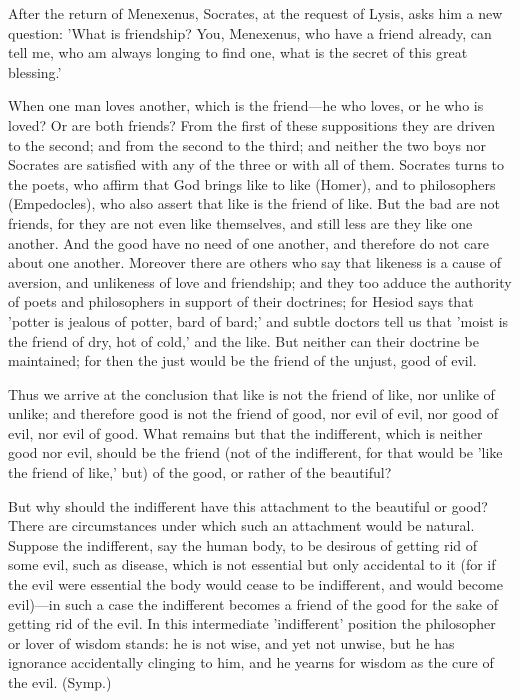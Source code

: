 \documentclass[11pt,letter]{article}
\begin{document}
\par  After the return of Menexenus, Socrates, at the request of Lysis, asks him a new question: 'What is friendship? You, Menexenus, who have a friend already, can tell me, who am always longing to find one, what is the secret of this great blessing.'

\par  When one man loves another, which is the friend—he who loves, or he who is loved? Or are both friends? From the first of these suppositions they are driven to the second; and from the second to the third; and neither the two boys nor Socrates are satisfied with any of the three or with all of them. Socrates turns to the poets, who affirm that God brings like to like (Homer), and to philosophers (Empedocles), who also assert that like is the friend of like. But the bad are not friends, for they are not even like themselves, and still less are they like one another. And the good have no need of one another, and therefore do not care about one another. Moreover there are others who say that likeness is a cause of aversion, and unlikeness of love and friendship; and they too adduce the authority of poets and philosophers in support of their doctrines; for Hesiod says that 'potter is jealous of potter, bard of bard;' and subtle doctors tell us that 'moist is the friend of dry, hot of cold,' and the like. But neither can their doctrine be maintained; for then the just would be the friend of the unjust, good of evil.

\par  Thus we arrive at the conclusion that like is not the friend of like, nor unlike of unlike; and therefore good is not the friend of good, nor evil of evil, nor good of evil, nor evil of good. What remains but that the indifferent, which is neither good nor evil, should be the friend (not of the indifferent, for that would be 'like the friend of like,' but) of the good, or rather of the beautiful?

\par  But why should the indifferent have this attachment to the beautiful or good? There are circumstances under which such an attachment would be natural. Suppose the indifferent, say the human body, to be desirous of getting rid of some evil, such as disease, which is not essential but only accidental to it (for if the evil were essential the body would cease to be indifferent, and would become evil)—in such a case the indifferent becomes a friend of the good for the sake of getting rid of the evil. In this intermediate 'indifferent' position the philosopher or lover of wisdom stands: he is not wise, and yet not unwise, but he has ignorance accidentally clinging to him, and he yearns for wisdom as the cure of the evil. (Symp.)
\end{document}
